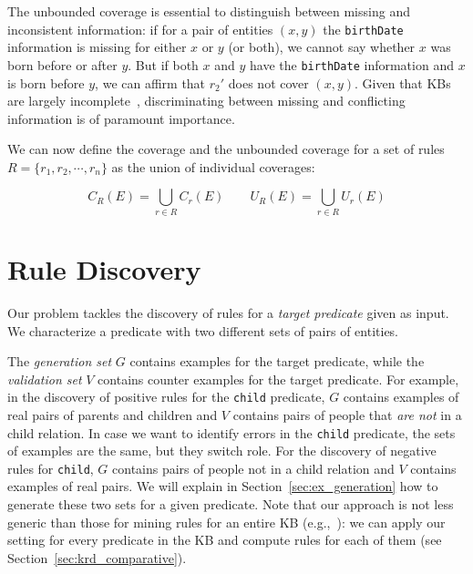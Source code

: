 \vspace{0.5ex}
The unbounded coverage is essential to distinguish between missing and inconsistent information: if for a pair of entities $(x,y)$ the \texttt{birthDate} information is missing for either $x$ or $y$ (or both), we cannot say whether $x$ was born before or after $y$. 
But if both $x$ and $y$ have the \texttt{birthDate} information and $x$ is born before $y$, we can affirm that $r_2'$ does not cover $(x,y)$. Given that KBs are largely incomplete~\cite{min2013distant}, discriminating between missing and conflicting information is of paramount importance.

We can now define the coverage and the unbounded coverage for a set of rules $R=\{r_1,r_2,\cdots,r_n\}$ as the union of individual coverages:


\vspace{-4mm}	
\begin{equation*}
	C_R(E) = \bigcup \limits_{r \in R} C_r(E) \qquad U_R(E) = \bigcup \limits_{r \in R} U_r(E) 	\end{equation*}
\vspace{-2mm}


\section{Rule Discovery} \label{sec:problem}

Our problem tackles the discovery of %
rules for a {\em target predicate} given as input. We characterize a predicate with two different sets of pairs of entities.

The \emph{generation set} $G$ contains examples for the target predicate, 
while the \emph{validation set} $V$ contains counter examples for the target predicate.
For example, in the discovery of positive rules for the {\tt child} predicate, $G$ contains examples of real pairs of parents and children and $V$ contains pairs of people that {\em are not} in a child relation. In case we want to identify errors in the {\tt child} predicate, the sets of examples are the same, but they switch role. For the discovery of negative rules for {\tt child}, $G$ contains pairs of people not in a child relation and $V$ contains examples of real pairs.
We will explain in Section~\ref{sec:ex_generation} how to generate these two sets for a given predicate. Note that our approach is not less generic than those for mining rules for an entire KB (e.g.,~\cite{abedjan2014amending,galarraga2015fast}): 
we can apply our setting for every predicate in the KB and compute rules for each of them (see Section~\ref{sec:krd_comparative}).

